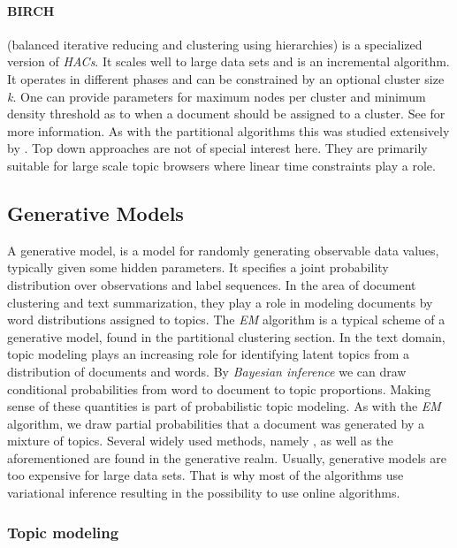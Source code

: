     \paragraph{BIRCH} (balanced iterative reducing and clustering using hierarchies) is a specialized version of \emph{HACs}. It scales well to large data sets and is an incremental algorithm. It operates in different phases and can be constrained by an optional cluster size \emph{k}. One can provide parameters for maximum nodes per cluster and minimum density threshold as to when a document should be assigned to a cluster. See 
    \cite{BIRCH1996} for more information. As with the partitional algorithms this was studied extensively by \cite{ClusteringBooAggarwalk2013, ClusterAlgoSurveyIBM, IRBook2008}. Top down approaches are not of special interest here. They are primarily suitable for large scale topic browsers where linear time constraints play a role.

    \subsection{Generative Models}   
    \label{sec:generative}

      A generative model, is a model for randomly generating observable data values, typically given some hidden parameters. It specifies a joint probability distribution over observations and label sequences. In the area of document clustering and text summarization, they play a role in modeling documents by word distributions assigned to topics. The \emph{EM} algorithm is a typical scheme of a generative model, found in the partitional clustering section. In the text domain, topic modeling plays an increasing role for identifying latent topics from a distribution of documents and words. By \emph{Bayesian inference} we can draw conditional probabilities from word to document to topic proportions. Making sense of these quantities is part of probabilistic topic modeling. As with the \emph{EM} algorithm, we draw partial probabilities that a document was generated by a mixture of topics. Several widely used methods, namely \ldafull{}, \hdpfull{} as well as the aforementioned \lsafull{} are found in the generative realm. Usually, generative models are too expensive for large data sets. That is why most of the algorithms use variational inference resulting in the possibility to use online algorithms. \cite{BishopML}

      \subsubsection{Topic modeling}
      \label{sec:topic_modelling}

